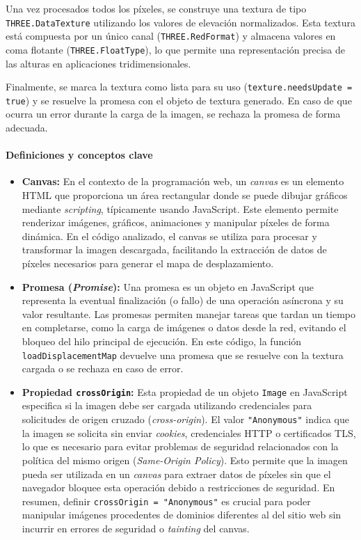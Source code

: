 \documentclass[a4paper, 12pt]{book}
\begin{document}
Una vez procesados todos los píxeles, se construye una textura de tipo \texttt{THREE.DataTexture} utilizando los valores de elevación normalizados. Esta textura está compuesta por un único canal (\texttt{THREE.RedFormat}) y almacena valores en coma flotante (\texttt{THREE.FloatType}), lo que permite una representación precisa de las alturas en aplicaciones tridimensionales.

Finalmente, se marca la textura como lista para su uso (\texttt{texture.needsUpdate = true}) y se resuelve la promesa con el objeto de textura generado. En caso de que ocurra un error durante la carga de la imagen, se rechaza la promesa de forma adecuada.

\paragraph{Definiciones y conceptos clave}

\begin{itemize}
  \item \textbf{Canvas:} En el contexto de la programación web, un \emph{canvas} es un elemento HTML que proporciona un área rectangular donde se puede dibujar gráficos mediante \textit{scripting}, típicamente usando JavaScript. Este elemento permite renderizar imágenes, gráficos, animaciones y manipular píxeles de forma dinámica. En el código analizado, el canvas se utiliza para procesar y transformar la imagen descargada, facilitando la extracción de datos de píxeles necesarios para generar el mapa de desplazamiento.

  \item \textbf{Promesa (\emph{Promise}):} Una promesa es un objeto en JavaScript que representa la eventual finalización (o fallo) de una operación asíncrona y su valor resultante. Las promesas permiten manejar tareas que tardan un tiempo en completarse, como la carga de imágenes o datos desde la red, evitando el bloqueo del hilo principal de ejecución. En este código, la función \texttt{loadDisplacementMap} devuelve una promesa que se resuelve con la textura cargada o se rechaza en caso de error.

  \item \textbf{Propiedad \texttt{crossOrigin}:} Esta propiedad de un objeto \texttt{Image} en JavaScript especifica si la imagen debe ser cargada utilizando credenciales para solicitudes de origen cruzado (\emph{cross-origin}). El valor \texttt{"Anonymous"} indica que la imagen se solicita sin enviar \textit{cookies}, credenciales HTTP o certificados TLS, lo que es necesario para evitar problemas de seguridad relacionados con la política del mismo origen (\emph{Same-Origin Policy}). Esto permite que la imagen pueda ser utilizada en un \emph{canvas} para extraer datos de píxeles sin que el navegador bloquee esta operación debido a restricciones de seguridad. En resumen, definir \texttt{crossOrigin = "Anonymous"} es crucial para poder manipular imágenes procedentes de dominios diferentes al del sitio web sin incurrir en errores de seguridad o \emph{tainting} del canvas.
\end{itemize}
\end{document}
